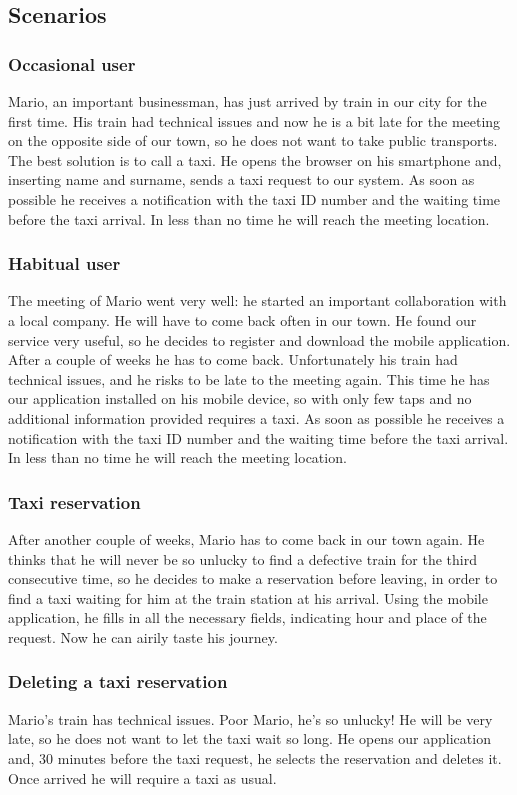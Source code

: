 	\subsection{Scenarios}
		\subsubsection{Occasional user}
			Mario, an important businessman, has just arrived by train in our city for the first time.
			His train had technical issues and now he is a bit late for the meeting on 
			the opposite side of our town, so he does not want to take public transports.
			The best solution is to call a taxi.
			He opens the browser on his smartphone and, inserting name and surname, sends a taxi request
			to our system. As soon as possible he receives a notification with the taxi ID number and the
			waiting time before the taxi arrival. In less than no time he will reach the meeting location.
		\subsubsection{Habitual user}
			The meeting of Mario went very well: he started an important collaboration with a local
			company. He will have to come back often in our town. He found our service very useful, so
			he decides to register and download the mobile application. After a couple of weeks he has to
			come back. Unfortunately his train had technical issues, and he risks to be late to the
			meeting again. This time he has our application installed on his mobile device, so with only
			few taps and no additional information provided requires a taxi. As soon as possible he receives
			a notification with the taxi ID number and the	waiting time before the taxi arrival.
			In less than no time he will reach the meeting location.
		\subsubsection{Taxi reservation}
			After another couple of weeks, Mario has to come back in our town again. He thinks that he 
			will never be so unlucky to find a defective train for the third consecutive time,
			so he decides to make a reservation before leaving,	in order to find a taxi waiting for him
			at the train station at his arrival. Using the mobile application, he fills in all the
			necessary fields, indicating hour and place of the request.
			Now he can airily taste	his journey.
		\subsubsection{Deleting a taxi reservation}
			Mario's train has technical issues. Poor Mario, he's so unlucky! He will be very late, 
			so he does not want to let the taxi wait so long. He opens our application and, 30 minutes
			before the taxi request, he selects the reservation and deletes it. Once arrived he will
			require a taxi as usual.
